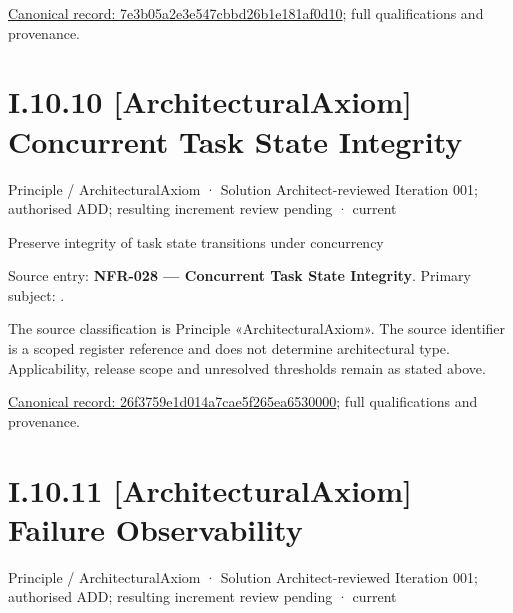 {\footnotesize \href{../../../../continuum/motivation/principle/architectural-axiom/7e3b05a2e3e547cbbd26b1e181af0d10.md}{Canonical record: 7e3b05a2e3e547cbbd26b1e181af0d10}; full qualifications and provenance.}\par
\section*{I.10.10 [ArchitecturalAxiom] Concurrent Task State Integrity}
\label{navigation:I.10.10}

\label{element:26f3759e1d014a7cae5f265ea6530000}
{\small Principle / ArchitecturalAxiom · Solution Architect-reviewed Iteration 001; authorised ADD; resulting increment review pending · current}\par

Preserve integrity of task state transitions under concurrency



Source entry: \textbf{NFR-028 — Concurrent Task State Integrity}. Primary subject: \texttt{}.



The source classification is Principle «ArchitecturalAxiom». The source identifier is a scoped register reference and does not determine architectural type. Applicability, release scope and unresolved thresholds remain as stated above.


{\footnotesize \href{../../../../continuum/motivation/principle/architectural-axiom/26f3759e1d014a7cae5f265ea6530000.md}{Canonical record: 26f3759e1d014a7cae5f265ea6530000}; full qualifications and provenance.}\par
\section*{I.10.11 [ArchitecturalAxiom] Failure Observability}
\label{navigation:I.10.11}

\label{element:2ed20179a98d44a68880958155e47923}
{\small Principle / ArchitecturalAxiom · Solution Architect-reviewed Iteration 001; authorised ADD; resulting increment review pending · current}\par

